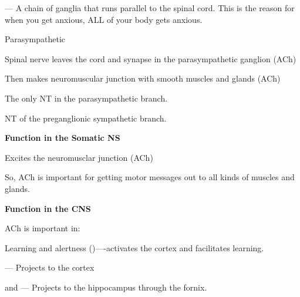 \begin{coloredlist}
\begin{coloredlist}
\begin{coloredlist}
\begin{coloredlist}
\begin{coloredlist}
                \end{coloredlist}
                \item {} — A chain of ganglia that runs parallel to the spinal cord. This is the reason for when you get anxious, ALL of your body gets anxious.
            \end{coloredlist}
            \item Parasympathetic
            \begin{coloredlist}
                \item Spinal nerve leaves the cord and synapse in the parasympathetic ganglion (ACh)
                \item Then makes neuromuscular junction with smooth muscles and glands (ACh)
            \end{coloredlist}
            \item The only NT in the parasympathetic branch.
            \item NT of the preganglionic sympathetic branch.
        \end{coloredlist}
        \item \textbf{Function in the Somatic NS}
        \begin{coloredlist}
            \item Excites the neuromusclar junction (ACh)
            \item So, ACh is important for getting motor messages out to all kinds of muscles and glands.
        \end{coloredlist}
        \item \textbf{Function in the CNS}
        \begin{coloredlist}
            \item ACh is important in:
            \begin{coloredlist}
                \item Learning and alertness ()—-activates the cortex and facilitates learning.
                \begin{coloredlist}
                    \item {} — Projects to the cortex
                    \item {} and  — Projects to the hippocampus through the fornix.

\end{coloredlist}
\end{coloredlist}
\end{coloredlist}
\end{coloredlist}
\end{coloredlist}
